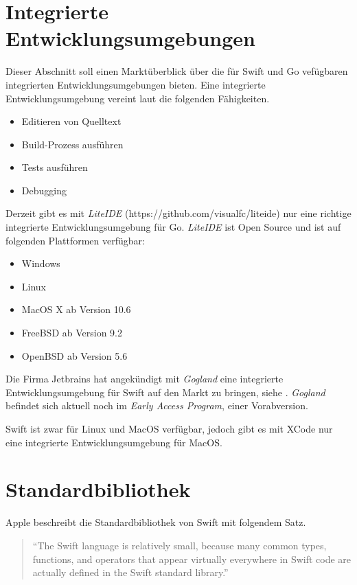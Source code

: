 \section{Integrierte Entwicklungsumgebungen}
\label{sec:IDE}
Dieser Abschnitt soll einen Marktüberblick über die für Swift und Go vefügbaren integrierten Entwicklungsumgebungen bieten.
Eine integrierte Entwicklungsumgebung vereint laut \cite[]{TechnoPedia} die folgenden Fähigkeiten.

\begin{itemize}
    \item Editieren von Quelltext
    \item Build-Prozess ausführen
    \item Tests ausführen
    \item Debugging
\end{itemize}

Derzeit gibt es mit \textit{LiteIDE} (https://github.com/visualfc/liteide) nur eine richtige integrierte Entwicklungsumgebung für Go.
\textit{LiteIDE} ist Open Source und ist auf folgenden Plattformen verfügbar:

\begin{itemize}
    \item Windows 
    \item Linux
    \item MacOS X ab Version 10.6
    \item FreeBSD ab Version 9.2
    \item OpenBSD ab Version 5.6
\end{itemize}

Die Firma Jetbrains hat angekündigt mit \textit{Gogland}\cite[]{Gogland} eine integrierte Entwicklungsumgebung für Swift auf den Markt zu bringen, siehe \cite[]{Gogland.Heise}.
\textit{Gogland} befindet sich aktuell noch im \textit{Early Access Program}, einer Vorabversion.

Swift ist zwar für Linux und MacOS verfügbar, jedoch gibt es mit XCode nur eine integrierte Entwicklungsumgebung für MacOS.

\section{Standardbibliothek}
Apple beschreibt die Standardbibliothek von Swift mit folgendem Satz.
\begin{quote}
\enquote{The Swift language is relatively small, because many common types, functions, and operators that appear virtually everywhere in Swift code are actually defined in the Swift standard library.} \cite[S.427]{Apple.2017}
\end{quote}

